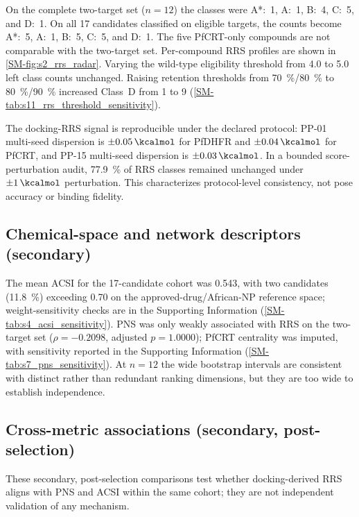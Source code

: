 \documentclass[11pt,a4paper]{article}
\begin{document}
On the complete two-target set ($n=\num{12}$) the classes were A*:~\num{1}, A:~\num{1}, B:~\num{4}, C:~\num{5}, and D:~\num{1}. On all 17 candidates classified on eligible targets, the counts become A*:~\num{5}, A:~\num{1}, B:~\num{5}, C:~\num{5}, and D:~\num{1}. The five PfCRT-only compounds are not comparable with the two-target set. Per-compound RRS profiles are shown in \cref{SM-fig:s2_rrs_radar}. Varying the wild-type eligibility threshold from \qty{4.0}{\kcalmol} to \qty{5.0}{\kcalmol} left class counts unchanged. Raising retention thresholds from \qty{70}{\percent}/\qty{80}{\percent} to \qty{80}{\percent}/\qty{90}{\percent} increased Class~D from 1 to 9 (\cref{SM-tab:s11_rrs_threshold_sensitivity}).

The docking-RRS signal is reproducible under the declared protocol: PP-01 multi-seed dispersion is $\pm\qty{0.05}{\kcalmol}$ for PfDHFR and $\pm\qty{0.04}{\kcalmol}$ for PfCRT, and PP-15 multi-seed dispersion is $\pm\qty{0.03}{\kcalmol}$. In a bounded score-perturbation audit, \qty{77.9}{\percent} of RRS classes remained unchanged under $\pm\qty{1}{\kcalmol}$ perturbation. This characterizes protocol-level consistency, not pose accuracy or binding fidelity.

\subsection{Chemical-space and network descriptors (secondary)}

The mean ACSI for the 17-candidate cohort was \num{0.543}, with two candidates (\qty{11.8}{\percent}) exceeding \num{0.70} on the approved-drug/African-NP reference space; weight-sensitivity checks are in the Supporting Information (\cref{SM-tab:s4_acsi_sensitivity}). PNS was only weakly associated with RRS on the two-target set ($\rho=\num{-0.2098}$, adjusted $p=\num{1.0000}$); PfCRT centrality was imputed, with sensitivity reported in the Supporting Information (\cref{SM-tab:s7_pns_sensitivity}). At $n=\num{12}$ the wide bootstrap intervals are consistent with distinct rather than redundant ranking dimensions, but they are too wide to establish independence.

\subsection{Cross-metric associations (secondary, post-selection)}

These secondary, post-selection comparisons test whether docking-derived RRS aligns with PNS and ACSI within the same cohort; they are not independent validation of any mechanism.
\end{document}
